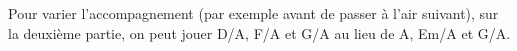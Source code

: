 \chords {
  \Anotd
  \GbAva
  \AMaj
  \EmbA
  \GbA
  \DbA
  \FbA
}

\tune

Pour varier l'accompagnement (par exemple avant de passer à l'air suivant),
sur la deuxième partie, on peut jouer D/A, F/A et G/A au lieu de A, Em/A et
G/A.
